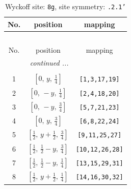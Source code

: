 \documentclass[fleqn,8pt]{jsarticle}
\begin{document}
\begin{longtable}{ccc}
\caption{Wyckoff site: {\tt 8g}, site symmetry: {\tt .2.1'}}
 \\
 \hline \hline
No. & position & mapping \\ \hline \endfirsthead

\multicolumn{2}{l}{\tablename\ \thetable{}} \\
 \hline \hline
No. & position & mapping \\ \hline \endhead

 \hline \hline
\multicolumn{2}{r}{\footnotesize\it continued ...} \\ \endfoot

 \hline \hline
\multicolumn{2}{r}{} \\ \endlastfoot

1 & $\left[ 0,\, y,\, \frac{1}{4} \right]$ & {\tt [1,3,17,19]} \\ \hline
2 & $\left[ 0,\, - y,\, \frac{1}{4} \right]$ & {\tt [2,4,18,20]} \\ \hline
3 & $\left[ 0,\, - y,\, \frac{3}{4} \right]$ & {\tt [5,7,21,23]} \\ \hline
4 & $\left[ 0,\, y,\, \frac{3}{4} \right]$ & {\tt [6,8,22,24]} \\ \hline
5 & $\left[ \frac{1}{2},\, y + \frac{1}{2},\, \frac{3}{4} \right]$ & {\tt [9,11,25,27]} \\ \hline
6 & $\left[ \frac{1}{2},\, \frac{1}{2} - y,\, \frac{3}{4} \right]$ & {\tt [10,12,26,28]} \\ \hline
7 & $\left[ \frac{1}{2},\, \frac{1}{2} - y,\, \frac{1}{4} \right]$ & {\tt [13,15,29,31]} \\ \hline
8 & $\left[ \frac{1}{2},\, y + \frac{1}{2},\, \frac{1}{4} \right]$ & {\tt [14,16,30,32]} \\
\end{longtable}
\renewcommand{\arraystretch}{1.2}
\end{document}
